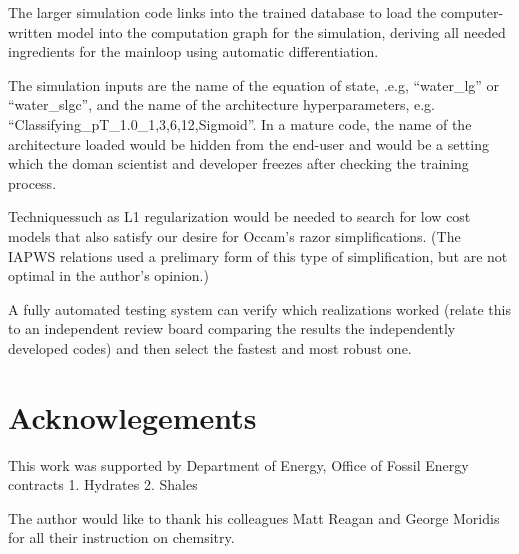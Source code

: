 \documentclass[]{article}
\begin{document}
The larger simulation code links into the trained database to load the
computer-written model into the computation graph for the simulation,
deriving all needed ingredients for the mainloop using automatic
differentiation.

The simulation inputs are the name of the equation of state, .e.g,
``water\_lg'' or ``water\_slgc'', and the name of the architecture
hyperparameters, e.g. ``Classifying\_pT\_1.0\_1,3,6,12,Sigmoid''.
In a mature code, the name of the architecture loaded would be hidden
from the end-user and would be a setting which the doman scientist and developer freezes
after checking the training process.

Techniquessuch as L1 regularization would be needed to search for low
cost models that also satisfy our desire for Occam's razor
simplifications. (The IAPWS relations used a prelimary form of this
type of simplification, but are not optimal in the author's opinion.)

A fully automated testing system can verify which realizations worked
(relate this to an independent review board comparing the results the
independently developed codes) and then select the fastest and most
robust one.

\section*{Acknowlegements}

This work was supported by Department of Energy, Office of Fossil
Energy contracts
1. Hydrates
2. Shales

The author would like to thank his colleagues Matt Reagan and George
Moridis for all their instruction on chemsitry. 


\end{document}
